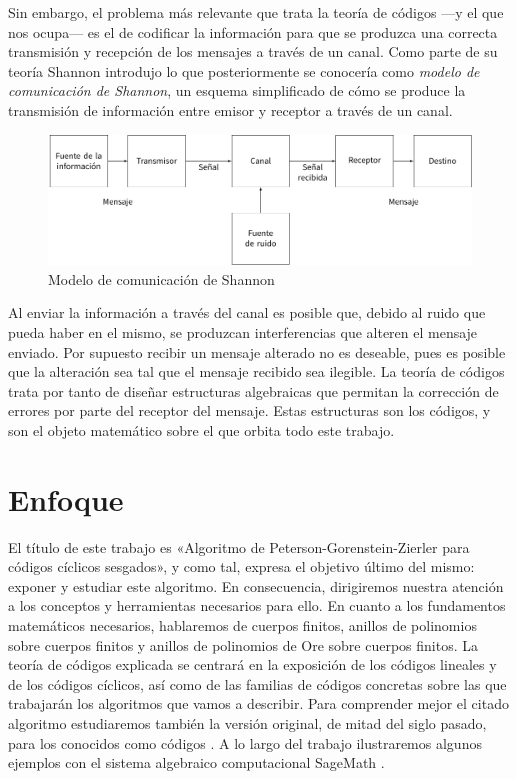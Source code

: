 Sin embargo, el problema más relevante que trata la teoría de códigos —y el que nos ocupa— es el de codificar la información para que se produzca una correcta transmisión y recepción de los mensajes a través de un canal.
Como parte de su teoría Shannon introdujo lo que posteriormente se conocería como \emph{modelo de comunicación de Shannon}, un esquema simplificado de cómo se produce la transmisión de información entre emisor y receptor a través de un canal.
\begin{figure}
  \includegraphics[width=\textwidth]{assets/shannon-communication-model.pdf}
  \caption*{Modelo de comunicación de Shannon}
\end{figure}
Al enviar la información a través del canal es posible que, debido al ruido que pueda haber en el mismo, se produzcan interferencias que alteren el mensaje enviado.
Por supuesto recibir un mensaje alterado no es deseable, pues es posible que la alteración sea tal que el mensaje recibido sea ilegible.
La teoría de códigos trata por tanto de diseñar estructuras algebraicas que permitan la corrección de errores por parte del receptor del mensaje.
Estas estructuras son los códigos, y son el objeto matemático sobre el que orbita todo este trabajo.

\section*{Enfoque}

El título de este trabajo es «Algoritmo de Peterson-Gorenstein-Zierler para códigos cíclicos sesgados», y como tal, expresa el objetivo último del mismo: exponer y estudiar este algoritmo.
En consecuencia, dirigiremos nuestra atención a los conceptos y herramientas necesarios para ello.
En cuanto a los fundamentos matemáticos necesarios, hablaremos de cuerpos finitos, anillos de polinomios sobre cuerpos finitos y anillos de polinomios de Ore sobre cuerpos finitos.
La teoría de códigos explicada se centrará en la exposición de los códigos lineales y de los códigos cíclicos, así como de las familias de códigos concretas sobre las que trabajarán los algoritmos que vamos a describir.
Para comprender mejor el citado algoritmo estudiaremos también la versión original, de mitad del siglo pasado, para los conocidos como códigos .
A lo largo del trabajo ilustraremos algunos ejemplos con el sistema algebraico computacional SageMath \parencite{the_sage_developers_sagemath_2020}.

